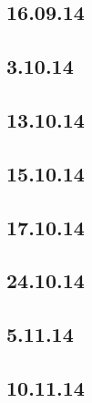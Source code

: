 \documentclass[11pt]{article}
\begin{document}
	\subsection{16.09.14}
	
	
	\subsection{3.10.14}
	
	
	\subsection{13.10.14}
	
	
	\subsection{15.10.14}
	
	
	\subsection{17.10.14}
	

	\subsection{24.10.14}
		
	
	\subsection{5.11.14}
		

	\subsection{10.11.14}
\end{document}
